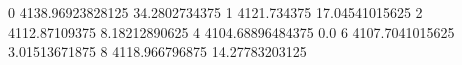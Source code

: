 0 4138.96923828125 34.2802734375
1 4121.734375 17.04541015625
2 4112.87109375 8.18212890625
4 4104.68896484375 0.0
6 4107.7041015625 3.01513671875
8 4118.966796875 14.27783203125
